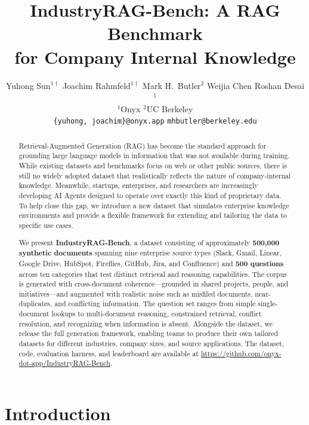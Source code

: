 \documentclass{article}
\title{IndustryRAG-Bench: A RAG Benchmark\\for Company Internal Knowledge}
\author{
  Yuhong Sun$^{1\dagger}$ \quad
  Joachim Rahmfeld$^{1\dagger}$ \quad
  Mark H.\ Butler$^{2}$ \quad
  Weijia Chen \quad
  Roshan Desai$^{1}$ \\[0.5em]
  $^{1}$Onyx \quad $^{2}$UC Berkeley \\[0.3em]
  \texttt{\{yuhong, joachim\}@onyx.app} \quad \texttt{mhbutler@berkeley.edu}
}
\begin{document}
\maketitle

\begin{abstract}
Retrieval-Augmented Generation (RAG) has become the standard approach for grounding large language models in information that was not available during training. While existing datasets and benchmarks focus on web or other public sources, there is still no widely adopted dataset that realistically reflects the nature of company-internal knowledge. Meanwhile, startups, enterprises, and researchers are increasingly developing AI Agents designed to operate over exactly this kind of proprietary data. To help close this gap, we introduce a new dataset that simulates enterprise knowledge environments and provide a flexible framework for extending and tailoring the data to specific use cases.

We present \textbf{IndustryRAG-Bench}, a dataset consisting of approximately \textbf{500,000 synthetic documents} spanning nine enterprise source types (Slack, Gmail, Linear, Google Drive, HubSpot, Fireflies, GitHub, Jira, and Confluence) and \textbf{500 questions} across ten categories that test distinct retrieval and reasoning capabilities. The corpus is generated with cross-document coherence---grounded in shared projects, people, and initiatives---and augmented with realistic noise such as misfiled documents, near-duplicates, and conflicting information. The question set ranges from simple single-document lookups to multi-document reasoning, constrained retrieval, conflict resolution, and recognizing when information is absent. Alongside the dataset, we release the full generation framework, enabling teams to produce their own tailored datasets for different industries, company sizes, and source applications. The dataset, code, evaluation harness, and leaderboard are available at \url{https://github.com/onyx-dot-app/IndustryRAG-Bench}.
\end{abstract}

\section{Introduction}
\label{sec:intro}
\end{document}
